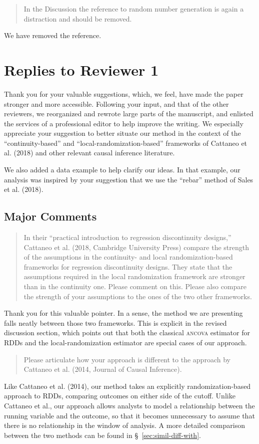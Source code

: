 \documentclass[12pt]{article}
\begin{document}
\begin{quote}
In the Discussion the reference to random number generation is again a
distraction and should be removed.
\end{quote}
We have removed the reference.


\section{Replies to Reviewer 1}
Thank you for your valuable suggestions, which, we feel, have made the
paper stronger and more accessible. Following your input, and that of
the other reviewers, we reorganized and rewrote large parts of the
manuscript, and enlisted the services of a professional editor to help
improve the writing. We especially appreciate your suggestion to
better situate our method in the context of the ``continuity-based''
and ``local-randomization-based'' frameworks of Cattaneo et
al. (2018) and other relevant causal inference literature.

We also added a data example to help clarify our ideas. In that
example, our analysis was inspired by your suggestion that we use the
``rebar'' method of Sales et al. (2018).



\subsection{Major Comments}
\begin{quote}
In their “practical introduction to regression discontinuity designs,”
Cattaneo et al. (2018, Cambridge University Press) compare the
strength of the assumptions in the continuity- and local
randomization-based frameworks for regression discontinuity
designs. They state that the assumptions required in the local randomization framework are stronger than in the continuity one. Please
comment on this. Please also compare the strength of your assumptions
to the ones of the two other frameworks.
\end{quote}

Thank you for this valuable pointer. In a sense, the method we are
presenting falls neatly between those two frameworks.
This is explicit in the revised discussion section, which points out
that both the classical \textsc{ancova} estimator for RDDs and the
local-randomization estimator are special cases of our approach.

\begin{quote}
Please articulate how your approach is different to the approach by
Cattaneo et al. (2014, Journal of Causal Inference).
\end{quote}
Like Cattaneo et al. (2014), our method takes an explicitly
randomization-based approach to RDDs, comparing outcomes on either
side of the cutoff. Unlike Cattaneo et al., our approach allows
analysts to model a relationship between the running variable and the
outcome, so that it becomes unnecessary to assume that there is no
relationship in the window of analysis. A more detailed comparison
between the two methods can be found in \S~\ref{sec:simil-diff-with}.
\end{document}

